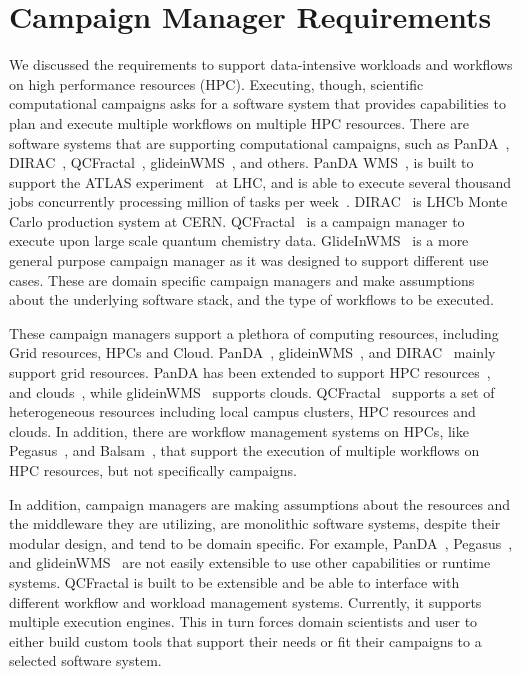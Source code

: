 \label{ch:cmanager}

\section{Campaign Manager Requirements}
We discussed the requirements to support data-intensive workloads and workflows on high performance resources (HPC).
Executing, though, scientific computational campaigns asks for a software system that provides capabilities to plan and execute multiple workflows on multiple HPC resources.
There are software systems that are supporting computational campaigns, such as PanDA~\cite{maeno2008panda}, DIRAC~\cite{casajus2010dirac}, QCFractal~\cite{qcfractal}, glideinWMS~\cite{sfiligoi2008glidein}, and others. 
PanDA WMS~\cite{maeno2008panda}, is built to support the ATLAS experiment~\cite{atlas} at LHC, and is able to execute several thousand jobs concurrently processing million of tasks per week~\cite{de2015future}.
DIRAC~\cite{tsaregorodtsev2003dirac} is LHCb Monte Carlo production system at CERN.
QCFractal~\cite{qcfractal} is a campaign manager to execute upon large scale quantum chemistry data.
GlideInWMS~\cite{sfiligoi2008glidein} is a more general purpose campaign manager as it was designed to support different use cases.
These are domain specific campaign managers and make assumptions about the underlying software stack, and the type of workflows to be executed.

These campaign managers support a plethora of computing resources, including Grid resources, HPCs and Cloud.
PanDA~\cite{maeno2008panda}, glideinWMS~\cite{sfiligoi2008glidein}, and DIRAC~\cite{casajus2010dirac} mainly support grid resources.
PanDA has been extended to support HPC resources~\cite{de2015future, de2016accelerating}, and clouds~\cite{de2016accelerating}, while glideinWMS~\cite{sfiligoi2008glidein} supports clouds.
QCFractal~\cite{qcfractal} supports a set of heterogeneous resources including local campus clusters, HPC resources and clouds.
In addition, there are workflow management systems on HPCs, like Pegasus~\cite{deelman2015pegasus}, and Balsam~\cite{salim2019balsam}, that support the execution of multiple workflows on HPC resources, but not specifically campaigns.

In addition, campaign managers are making assumptions about the resources and the middleware they are utilizing, are monolithic software systems, despite their modular design, and tend to be domain specific.
For example, PanDA~\cite{maeno2008panda}, Pegasus~\cite{deelman2015pegasus}, and glideinWMS~\cite{sfiligoi2008glidein} are not easily extensible to use other capabilities or runtime systems.
QCFractal is built to be extensible and be able to interface with different workflow and workload management systems. Currently, it supports multiple execution engines.
This in turn forces domain scientists and user to either build custom tools that support their needs or fit their campaigns to a selected software system.


